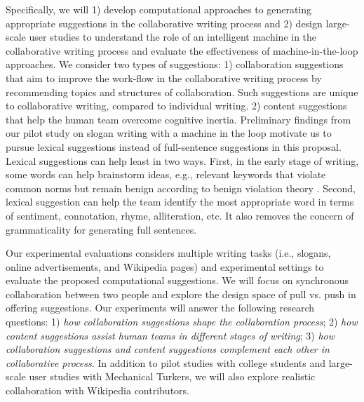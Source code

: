 Specifically, we will 1) develop computational approaches to generating appropriate suggestions in the collaborative writing process and 2) design large-scale user studies to understand the role of an intelligent machine in the collaborative writing process and evaluate the effectiveness of machine-in-the-loop approaches.
We consider two types of suggestions:
1) collaboration suggestions that aim to improve the work-flow in the collaborative writing process by recommending topics and structures of collaboration.
Such suggestions are unique to collaborative writing, compared to individual writing.
2) content suggestions that help the human team overcome cognitive inertia.
Preliminary findings from our pilot study on slogan writing with a machine in the loop motivate us to pursue lexical suggestions instead of full-sentence suggestions in this proposal.
Lexical suggestions can help least in two ways.
First, in the early stage of writing, some words can help brainstorm ideas, e.g., relevant keywords that violate common norms but remain benign according to benign violation theory \citep{warren_opinion:_2015}.
Second, lexical suggestion can help the team identify the most appropriate word in terms of sentiment, connotation, rhyme, alliteration, etc.
It also removes the concern of grammaticality for generating full sentences.

Our experimental evaluations considers multiple writing tasks (i.e., slogans, online advertisements, and Wikipedia pages) and experimental settings to evaluate the proposed computational suggestions.
We will focus on synchronous collaboration between two people and explore the design space of pull vs. push in offering suggestions.
Our experiments will answer the following research questions:
1) {\em how collaboration suggestions shape the collaboration process};
2) {\em how content suggestions assist human teams in different stages of writing};
3) {\em how collaboration suggestions and content suggestions complement each other in collaborative process}.
In addition to pilot studies with college students and large-scale user studies with Mechanical Turkers, we will also explore realistic collaboration with Wikipedia contributors.



